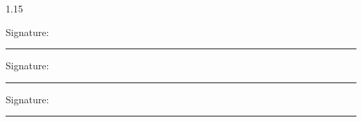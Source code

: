 \begin{spacing}{1.15}
\vspace{0.8cm}
\noindent
\begin{minipage}{0.32\textwidth}\small Signature: \rule{1.65cm}{0.4pt}\end{minipage}\hfill
\begin{minipage}{0.29\textwidth}\small Signature: \rule{1.4cm}{0.4pt}\end{minipage}\hfill
\begin{minipage}{0.34\textwidth}\small Signature: \rule{1.7cm}{0.4pt}\end{minipage}
\end{spacing}
\clearpage
